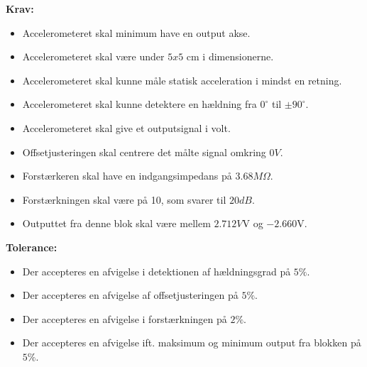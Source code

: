 \noindent\textbf{Krav:}
\begin{itemize}
	\item Accelerometeret skal minimum have en output akse.%
	\item Accelerometeret skal være under $5x5$ cm i dimensionerne.%
	\item Accelerometeret skal kunne måle statisk acceleration i mindst en retning.
	\item Accelerometeret skal kunne detektere en hældning fra $0^{\circ}$ til $\pm90^{\circ}$.
	\item Accelerometeret skal give et outputsignal i volt.
	\item Offsetjusteringen skal centrere det målte signal omkring $0V$.
	\item Forstærkeren skal have en indgangsimpedans på $3.68M\Omega$.
	\item Forstærkningen skal være på 10, som svarer til $20dB$.
	\item Outputtet fra denne blok skal være mellem $2.712V$V og $-2.660$V.
\end{itemize}
\textbf{Tolerance:}
\begin{itemize}
	\item Der accepteres en afvigelse i detektionen af hældningsgrad på $5\%$.
	\item Der accepteres en afvigelse af offsetjusteringen på $5\%$.
	\item Der accepteres en afvigelse i forstærkningen på $2\%$.
	\item Der accepteres en afvigelse ift. maksimum og minimum output fra blokken på $5\%$.
\end{itemize}

